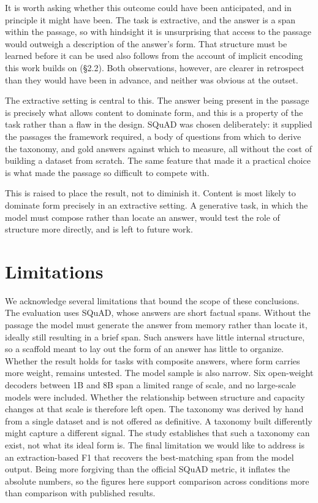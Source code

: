 \documentclass{article}
\begin{document}
It is worth asking whether this outcome could have been anticipated, and in principle it might have been. The task is extractive, and the answer is a span within the passage, so with hindsight it is unsurprising that access to the passage would outweigh a description of the answer's form. That structure must be learned before it can be used also follows from the account of implicit encoding this work builds on (\S2.2). Both observations, however, are clearer in retrospect than they would have been in advance, and neither was obvious at the outset.

The extractive setting is central to this. The answer being present in the passage is precisely what allows content to dominate form, and this is a property of the task rather than a flaw in the design. SQuAD was chosen deliberately: it supplied the passages the framework required, a body of questions from which to derive the taxonomy, and gold answers against which to measure, all without the cost of building a dataset from scratch. The same feature that made it a practical choice is what made the passage so difficult to compete with.

This is raised to place the result, not to diminish it. Content is most likely to dominate form precisely in an extractive setting. A generative task, in which the model must compose rather than locate an answer, would test the role of structure more directly, and is left to future work.

\section{Limitations}

We acknowledge several limitations that bound the scope of these conclusions. The evaluation uses SQuAD, whose answers are short factual spans. Without the passage the model must generate the answer from memory rather than locate it, ideally still resulting in a brief span. Such answers have little internal structure, so a scaffold meant to lay out the form of an answer has little to organize. Whether the result holds for tasks with composite answers, where form carries more weight, remains untested. The model sample is also narrow. Six open-weight decoders between 1B and 8B span a limited range of scale, and no large-scale models were included. Whether the relationship between structure and capacity changes at that scale is therefore left open. The taxonomy was derived by hand from a single dataset and is not offered as definitive. A taxonomy built differently might capture a different signal. The study establishes that such a taxonomy can exist, not what its ideal form is. The final limitation we would like to address is an extraction-based F1 that recovers the best-matching span from the model output. Being more forgiving than the official SQuAD metric, it inflates the absolute numbers, so the figures here support comparison across conditions more than comparison with published results.
\end{document}

